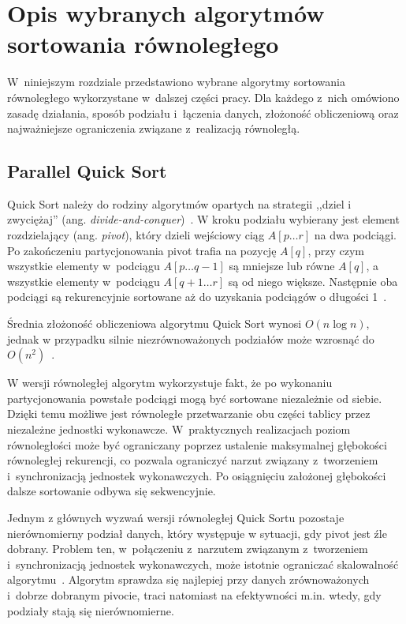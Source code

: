 \cleardoublepage
\chapter{Opis wybranych algorytmów sortowania równoległego}
\label{cha:WybraneAlgorytmy}

W~niniejszym rozdziale przedstawiono wybrane algorytmy sortowania równoległego wykorzystane w~dalszej części pracy. 
Dla każdego z~nich omówiono zasadę działania, sposób podziału i~łączenia danych, złożoność obliczeniową 
oraz najważniejsze ograniczenia związane z~realizacją równoległą.

\section{Parallel Quick Sort}
\label{sec:ParallelQuicksort}

Quick Sort należy do rodziny algorytmów opartych na strategii ,,dziel i zwyciężaj'' (ang. \textit{divide-and-conquer})~\cite{bib:CLRS4}. 
W kroku podziału wybierany jest element rozdzielający (ang. \textit{pivot}), który dzieli wejściowy ciąg $A[p \ldots r]$ na dwa podciągi. 
Po zakończeniu partycjonowania pivot trafia na pozycję $A[q]$, przy czym wszystkie elementy w~podciągu $A[p \ldots q-1]$ są mniejsze 
lub równe $A[q]$, a wszystkie elementy w~podciągu $A[q+1 \ldots r]$ są od niego większe. 
Następnie oba podciągi są rekurencyjnie sortowane aż do uzyskania podciągów o długości 1~\cite{bib:Božidar2015}.

Średnia złożoność obliczeniowa algorytmu Quick Sort wynosi $O(n\log n)$, 
jednak w przypadku silnie niezrównoważonych podziałów może wzrosnąć do $O(n^2)$~\cite{bib:CLRS4}.

W wersji równoległej algorytm wykorzystuje fakt, że po wykonaniu partycjonowania powstałe podciągi mogą być sortowane niezależnie od siebie. 
Dzięki temu możliwe jest równoległe przetwarzanie obu części tablicy przez niezależne jednostki wykonawcze. 
W~praktycznych realizacjach poziom równoległości może być ograniczany poprzez ustalenie maksymalnej głębokości równoległej rekurencji, 
co pozwala ograniczyć narzut związany z~tworzeniem i~synchronizacją jednostek wykonawczych. 
Po osiągnięciu założonej głębokości dalsze sortowanie odbywa się sekwencyjnie.

Jednym z głównych wyzwań wersji równoległej Quick Sortu pozostaje nierównomierny podział danych, który występuje w sytuacji, 
gdy pivot jest źle dobrany. Problem ten, w~połączeniu z~narzutem związanym z~tworzeniem i~synchronizacją jednostek wykonawczych, 
może istotnie ograniczać skalowalność algorytmu~\cite{bib:Maus}. 
Algorytm sprawdza się najlepiej przy danych zrównoważonych i~dobrze dobranym pivocie,
traci natomiast na efektywności m.in. wtedy, gdy podziały stają się nierównomierne.

